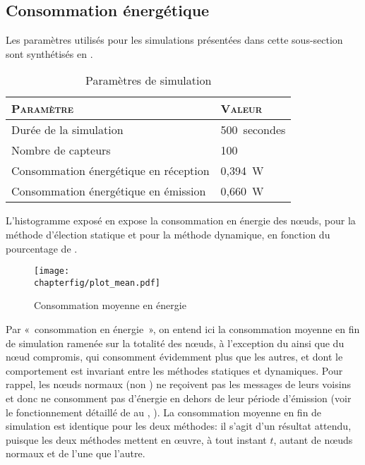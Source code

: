     \subsection{Consommation énergétique}

Les paramètres utilisés pour les simulations présentées dans cette sous-section sont synthétisés en .
\begin{table}[ht]
    \centering
    \caption{Paramètres de simulation}\label{sa:table:parametres2}
    \medskip
    \begin{tabular}{ll}
        \toprule
        \textsc{Paramètre}                    & \textsc{Valeur}\\
        \midrule
        Durée de la simulation                & 500~secondes\\
        Nombre de capteurs                    & 100\\
        Consommation énergétique en réception & 0,394~W\\
        Consommation énergétique en émission  & 0,660~W\\
        \bottomrule
    \end{tabular}
\end{table}

L'histogramme exposé en  expose la consommation en énergie des nœuds, pour la méthode d'élection statique et pour la méthode dynamique, en fonction du pourcentage de \cns.
\begin{figure}[!b]
    \centering
    \texttt{[image: \\chapterfig/plot\_mean.pdf]}
    \caption{Consommation moyenne en énergie}\label{sa:fig:conso-moyenne}
\end{figure}
Par «~consommation en énergie~», on entend ici la consommation moyenne en fin de simulation ramenée sur la totalité des nœuds, à l'exception du \ch ainsi que du nœud compromis, qui consomment évidemment plus que les autres, et dont le comportement est invariant entre les méthodes statiques et dynamiques.
Pour rappel, les nœuds normaux (non \cns) ne reçoivent pas les messages de leurs voisins et donc ne consomment pas d'énergie en dehors de leur période d'émission (voir le fonctionnement détaillé de \leach au , ).
La consommation moyenne en fin de simulation est identique pour les deux méthodes: il s'agit d'un résultat attendu, puisque les deux méthodes mettent en œuvre, à tout instant $t$, autant de nœuds normaux et de \cns l'une que l'autre.

